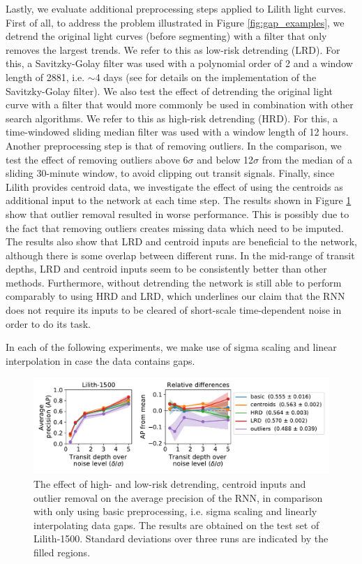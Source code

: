 Lastly, we evaluate additional preprocessing steps applied to Lilith light curves. First of all, to address the problem illustrated in Figure \ref{fig:gap_examples}, we detrend the original light curves (before segmenting) with a filter that only removes the largest trends. We refer to this as low-risk detrending (LRD). For this, a Savitzky-Golay filter was used with a polynomial order of 2 and a window length of 2881, i.e. $\sim$4 days (see \cite{hippke2019wotan} for details on the implementation of the Savitzky-Golay filter). We also test the effect of detrending the original light curve with a filter that would more commonly be used in combination with other search algorithms. We refer to this as high-risk detrending (HRD). For this, a time-windowed sliding median filter was used with a window length of 12 hours. Another preprocessing step is that of removing outliers. In the comparison, we test the effect of removing outliers above 6$\sigma$ and below 12$\sigma$ from the median of a sliding 30-minute window, to avoid clipping out transit signals. Finally, since Lilith provides centroid data, we investigate the effect of using the centroids as additional input to the network at each time step. The results shown in Figure \ref{fig:lilith_pp_advanced} show that outlier removal resulted in worse performance. This is possibly due to the fact that removing outliers creates missing data which need to be imputed. The results also show that LRD and centroid inputs are beneficial to the network, although there is some overlap between different runs. In the mid-range of transit depths, LRD and centroid inputs seem to be consistently better than other methods. Furthermore, without detrending the network is still able to perform comparably to using HRD and LRD, which underlines our claim that the RNN does not require its inputs to be cleared of short-scale time-dependent noise in order to do its task.

In each of the following experiments, we make use of sigma scaling and linear interpolation in case the data contains gaps.
\begin{figure}
    \centering
    \includegraphics[width=0.79\linewidth]{Experiments/Figures/Preprocessing/lilith1500_AP_pp-advanced.pdf}
    \caption{The effect of high- and low-risk detrending, centroid inputs and outlier removal on the average precision of the RNN, in comparison with only using basic preprocessing, i.e. sigma scaling and linearly interpolating data gaps. The results are obtained on the test set of Lilith-1500. Standard deviations over three runs are indicated by the filled regions.}
    \label{fig:lilith_pp_advanced}
\end{figure}
